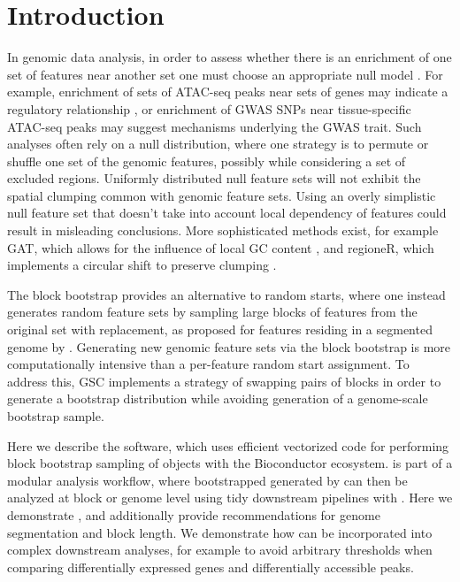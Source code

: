 \section{Introduction}
In genomic data analysis, in order to assess whether
there is an enrichment of one set of features near another set one
must choose an appropriate null model \citep{reviewdilemma2014}.
For example, enrichment of sets of ATAC-seq peaks near sets of genes
may indicate a regulatory relationship \citep{lee2020fluent}, or
enrichment of GWAS SNPs
near tissue-specific ATAC-seq peaks may suggest mechanisms underlying
the GWAS trait.
Such analyses often rely on a null distribution, where one
strategy is to permute or shuffle one set of the
genomic features, possibly while considering a set of excluded
regions.
Uniformly distributed null feature sets will not exhibit the spatial
clumping common with genomic feature sets.
Using an overly simplistic null feature set that doesn't take into
account local dependency of features could result in misleading
conclusions.
More sophisticated methods exist, for example
GAT, which allows for the influence of local GC content
\citep{GAT_2013}, and regioneR, which implements a circular shift to
preserve clumping \citep{gel2016regioner}.

The block bootstrap \citep{politis1999subsampling}
provides an alternative to random starts, where one instead generates
random feature sets by sampling large blocks of features from the
original set with replacement, as proposed for features residing in a
segmented genome by \citet{bickel2010subsampling}.
Generating new genomic feature sets via the block bootstrap is more
computationally intensive than a per-feature random start assignment.
To address this, GSC \citep{bickel2010subsampling} implements a
strategy of swapping pairs of blocks in order to generate a bootstrap
distribution while avoiding generation of a genome-scale bootstrap
sample.

Here we describe the \bootranges software, which uses efficient
vectorized code for performing block bootstrap sampling of
\granges \citep{lawrence2013software} objects with the Bioconductor
ecosystem.
\bootranges is part of a modular analysis workflow, where bootstrapped
\granges generated by \bootranges can then be analyzed at block or
genome level using tidy downstream pipelines with \plyranges
\citep{lee2019plyranges}.
Here we demonstrate \bootranges, and additionally provide
recommendations for genome segmentation and block length.
We demonstrate how \bootranges can be incorporated into complex
downstream analyses, for example to avoid arbitrary thresholds when
comparing differentially expressed genes and differentially accessible
peaks.

